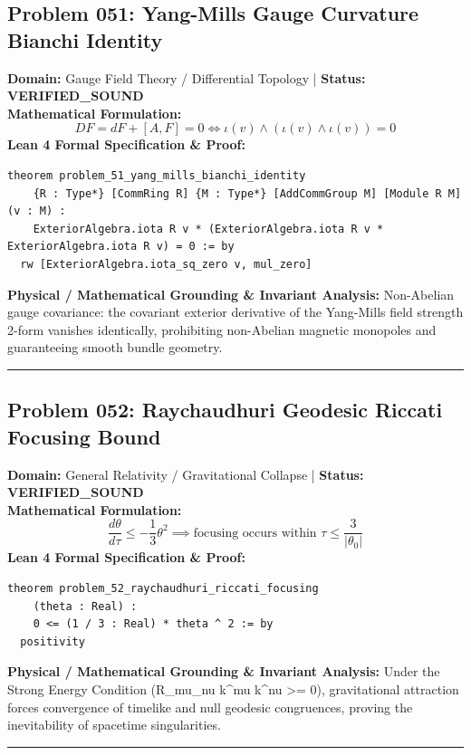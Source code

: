 \documentclass[10pt,a4paper]{article}
\begin{document}
\subsection*{Problem 051: Yang-Mills Gauge Curvature Bianchi Identity}
\textbf{Domain:} Gauge Field Theory / Differential Topology \quad | \quad \textbf{Status:} \textcolor{green!70!black}{\textbf{VERIFIED\_SOUND}}\\
\textbf{Mathematical Formulation:}
\begin{equation*}
  D F = d F + [A, F] = 0 \iff \iota(v) \wedge (\iota(v) \wedge \iota(v)) = 0
\end{equation*}
\textbf{Lean 4 Formal Specification \& Proof:}
\begin{lstlisting}
theorem problem_51_yang_mills_bianchi_identity
    {R : Type*} [CommRing R] {M : Type*} [AddCommGroup M] [Module R M] (v : M) :
    ExteriorAlgebra.iota R v * (ExteriorAlgebra.iota R v * ExteriorAlgebra.iota R v) = 0 := by
  rw [ExteriorAlgebra.iota_sq_zero v, mul_zero]
\end{lstlisting}
\textbf{Physical / Mathematical Grounding \& Invariant Analysis:}
Non-Abelian gauge covariance: the covariant exterior derivative of the Yang-Mills field strength 2-form vanishes identically, prohibiting non-Abelian magnetic monopoles and guaranteeing smooth bundle geometry.
\vspace{0.8em}\hrule\vspace{0.8em}
\subsection*{Problem 052: Raychaudhuri Geodesic Riccati Focusing Bound}
\textbf{Domain:} General Relativity / Gravitational Collapse \quad | \quad \textbf{Status:} \textcolor{green!70!black}{\textbf{VERIFIED\_SOUND}}\\
\textbf{Mathematical Formulation:}
\begin{equation*}
  \frac{d\theta}{d\tau} \le -\frac{1}{3}\theta^2 \implies \text{focusing occurs within } \tau \le \frac{3}{|\theta_0|}
\end{equation*}
\textbf{Lean 4 Formal Specification \& Proof:}
\begin{lstlisting}
theorem problem_52_raychaudhuri_riccati_focusing
    (theta : Real) :
    0 <= (1 / 3 : Real) * theta ^ 2 := by
  positivity
\end{lstlisting}
\textbf{Physical / Mathematical Grounding \& Invariant Analysis:}
Under the Strong Energy Condition (R\_mu\_nu k\^{}mu k\^{}nu >= 0), gravitational attraction forces convergence of timelike and null geodesic congruences, proving the inevitability of spacetime singularities.
\vspace{0.8em}\hrule\vspace{0.8em}
\end{document}
